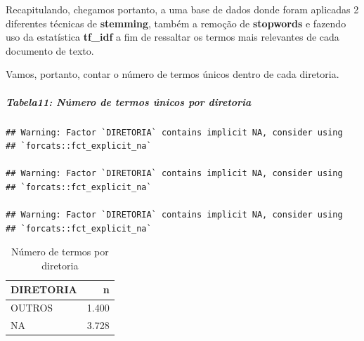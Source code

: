 \documentclass[]{article}
\newenvironment{Shaded}{\begin{snugshade}}{\end{snugshade}}
\newcommand{\DataTypeTok}[1]{\textcolor[rgb]{0.13,0.29,0.53}{#1}}
\newcommand{\KeywordTok}[1]{\textcolor[rgb]{0.13,0.29,0.53}{\textbf{#1}}}
\newcommand{\NormalTok}[1]{#1}
\newcommand{\OperatorTok}[1]{\textcolor[rgb]{0.81,0.36,0.00}{\textbf{#1}}}
\newcommand{\StringTok}[1]{\textcolor[rgb]{0.31,0.60,0.02}{#1}}
\let\oldsubparagraph\subparagraph
\renewcommand{\subparagraph}[1]{\oldsubparagraph{#1}\mbox{}}
\begin{document}
Recapitulando, chegamos portanto, a uma base de dados donde foram
aplicadas 2 diferentes técnicas de \textbf{stemming}, também a remoção
de \textbf{stopwords} e fazendo uso da estatística \textbf{tf\_idf} a
fim de ressaltar os termos mais relevantes de cada documento de texto.

Vamos, portanto, contar o número de termos únicos dentro de cada
diretoria.

\hypertarget{tabela11-numero-de-termos-unicos-por-diretoria}{%
\subparagraph{Tabela11: Número de termos únicos por
diretoria}\label{tabela11-numero-de-termos-unicos-por-diretoria}}

\begin{Shaded}
\end{Shaded}

\begin{verbatim}
## Warning: Factor `DIRETORIA` contains implicit NA, consider using
## `forcats::fct_explicit_na`

## Warning: Factor `DIRETORIA` contains implicit NA, consider using
## `forcats::fct_explicit_na`

## Warning: Factor `DIRETORIA` contains implicit NA, consider using
## `forcats::fct_explicit_na`
\end{verbatim}

\begin{Shaded}
\end{Shaded}

\begin{table}[!h]

\caption{\label{tab:unnamed-chunk-75}Número de termos por diretoria}
\centering
\begin{tabular}{lr}
\toprule
DIRETORIA & n\\
\midrule
\rowcolor{gray!6}  OUTROS & 1.400\\
NA & 3.728\\
\bottomrule
\end{tabular}
\end{table}
\end{document}
